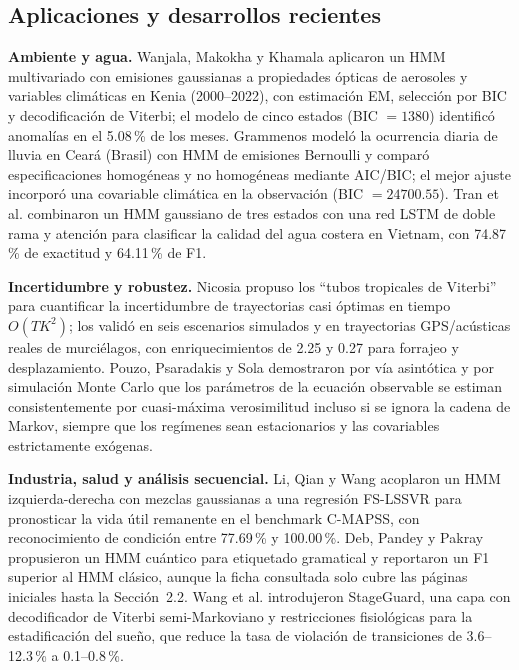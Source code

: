 \documentclass[11pt,letterpaper]{article}
\begin{document}
\subsection{Aplicaciones y desarrollos recientes}

\textbf{Ambiente y agua.} Wanjala, Makokha y Khamala \cite{wanjala2025} aplicaron un HMM multivariado con emisiones gaussianas a propiedades ópticas de aerosoles y variables climáticas en Kenia (2000--2022), con estimación EM, selección por BIC y decodificación de Viterbi; el modelo de cinco estados (BIC \(=1380\)) identificó anomalías en el 5.08\,\% de los meses. Grammenos \cite{grammenos2025} modeló la ocurrencia diaria de lluvia en Ceará (Brasil) con HMM de emisiones Bernoulli y comparó especificaciones homogéneas y no homogéneas mediante AIC/BIC; el mejor ajuste incorporó una covariable climática en la observación (BIC \(=24700.55\)). Tran et al. \cite{tran2026} combinaron un HMM gaussiano de tres estados con una red LSTM de doble rama y atención para clasificar la calidad del agua costera en Vietnam, con 74.87\,\% de exactitud y 64.11\,\% de F1.

\textbf{Incertidumbre y robustez.} Nicosia \cite{nicosia2026} propuso los ``tubos tropicales de Viterbi'' para cuantificar la incertidumbre de trayectorias casi óptimas en tiempo \(O(TK^2)\); los validó en seis escenarios simulados y en trayectorias GPS/acústicas reales de murciélagos, con enriquecimientos de 2.25 y 0.27 para forrajeo y desplazamiento. Pouzo, Psaradakis y Sola \cite{pouzo2025} demostraron por vía asintótica y por simulación Monte Carlo que los parámetros de la ecuación observable se estiman consistentemente por cuasi-máxima verosimilitud incluso si se ignora la cadena de Markov, siempre que los regímenes sean estacionarios y las covariables estrictamente exógenas.

\textbf{Industria, salud y análisis secuencial.} Li, Qian y Wang \cite{li2013} acoplaron un HMM izquierda-derecha con mezclas gaussianas a una regresión FS-LSSVR para pronosticar la vida útil remanente en el benchmark C-MAPSS, con reconocimiento de condición entre 77.69\,\% y 100.00\,\%. Deb, Pandey y Pakray \cite{deb2026} propusieron un HMM cuántico para etiquetado gramatical y reportaron un F1 superior al HMM clásico, aunque la ficha consultada solo cubre las páginas iniciales hasta la Sección~2.2. Wang et al. \cite{wang2026} introdujeron StageGuard, una capa con decodificador de Viterbi semi-Markoviano y restricciones fisiológicas para la estadificación del sueño, que reduce la tasa de violación de transiciones de 3.6--12.3\,\% a 0.1--0.8\,\%.
\end{document}
